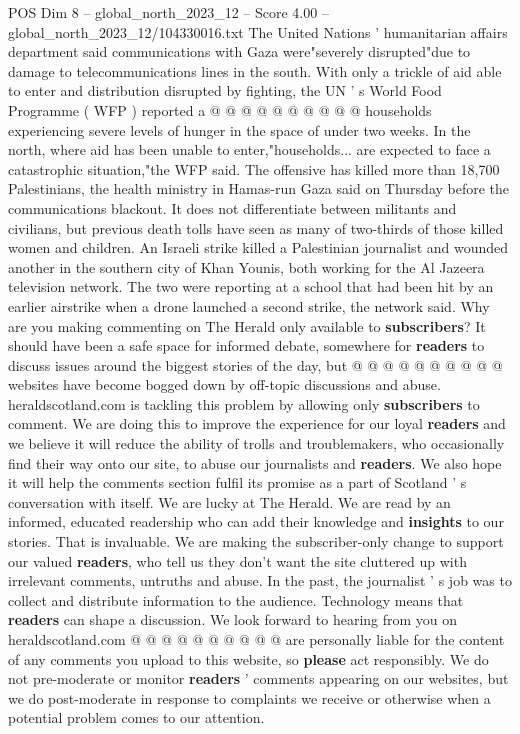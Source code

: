 \begin{textsample}{POS Dim 8 – global\_north\_2023\_12 – Score 4.00 – global\_north\_2023\_12/104330016.txt}
The United Nations ' humanitarian affairs department said communications with Gaza were"severely disrupted"due to damage to telecommunications lines in the south.
With only a trickle of aid able to enter and distribution disrupted by fighting, the UN ' s World Food Programme ( WFP ) reported a @ @ @ @ @ @ @ @ @ @ households experiencing severe levels of hunger in the space of under two weeks.
In the north, where aid has been unable to enter,"households... are expected to face a catastrophic situation,"the WFP said.
The offensive has killed more than 18,700 Palestinians, the health ministry in Hamas-run Gaza said on Thursday before the communications blackout.
It does not differentiate between militants and civilians, but previous death tolls have seen as many of two-thirds of those killed women and children.
An Israeli strike killed a Palestinian journalist and wounded another in the southern city of Khan Younis, both working for the Al Jazeera television network.
The two were reporting at a school that had been hit by an earlier airstrike when a drone launched a second strike, the network said.
Why are you making commenting on The Herald only available to \textbf{subscribers}?
It should have been a safe space for informed debate, somewhere for \textbf{readers} to discuss issues around the biggest stories of the day, but @ @ @ @ @ @ @ @ @ @ websites have become bogged down by off-topic discussions and abuse. heraldscotland.com is tackling this problem by allowing only \textbf{subscribers} to comment.
We are doing this to improve the experience for our loyal \textbf{readers} and we believe it will reduce the ability of trolls and troublemakers, who occasionally find their way onto our site, to abuse our journalists and \textbf{readers}.
We also hope it will help the comments section fulfil its promise as a part of Scotland ' s conversation with itself.
We are lucky at The Herald.
We are read by an informed, educated readership who can add their knowledge and \textbf{insights} to our stories.
That is invaluable.
We are making the subscriber-only change to support our valued \textbf{readers}, who tell us they don't want the site cluttered up with irrelevant comments, untruths and abuse.
In the past, the journalist ' s job was to collect and distribute information to the audience.
Technology means that \textbf{readers} can shape a discussion.
We look forward to hearing from you on heraldscotland.com @ @ @ @ @ @ @ @ @ @ are personally liable for the content of any comments you upload to this website, so \textbf{please} act responsibly.
We do not pre-moderate or monitor \textbf{readers} ' comments appearing on our websites, but we do post-moderate in response to complaints we receive or otherwise when a potential problem comes to our attention.

\end{textsample}
